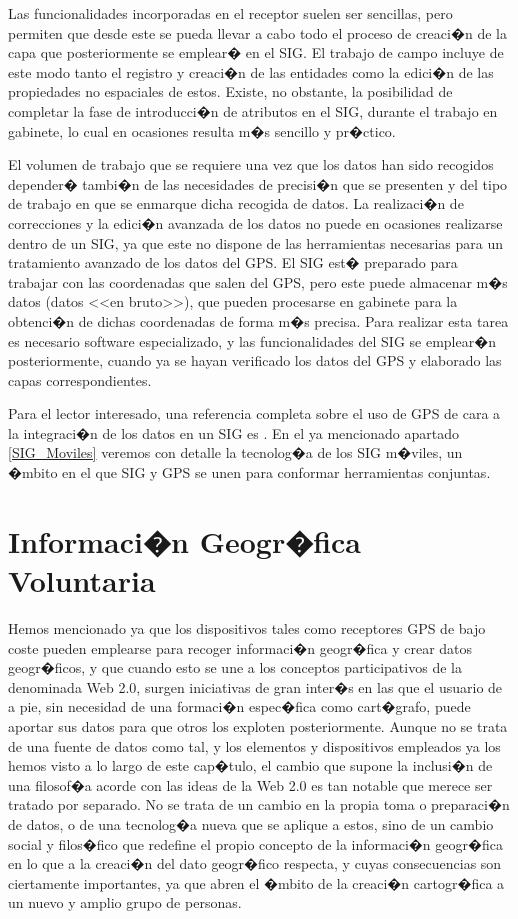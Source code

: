 Las funcionalidades incorporadas en el receptor suelen ser sencillas, pero permiten que desde este se pueda llevar a cabo todo el proceso de creaci�n de la capa que posteriormente se emplear� en el SIG. El trabajo de campo incluye de este modo tanto el registro y creaci�n de las entidades como la edici�n de las propiedades no espaciales de estos. Existe, no obstante, la posibilidad de completar la fase de introducci�n de atributos en el SIG, durante el trabajo en gabinete, lo cual en ocasiones resulta m�s sencillo y pr�ctico.

El volumen de trabajo que se requiere una vez que los datos han sido recogidos depender� tambi�n de las necesidades de precisi�n que se presenten y del tipo de trabajo en que se enmarque dicha recogida de datos. La realizaci�n de correcciones y la edici�n avanzada de los datos no puede en ocasiones realizarse dentro de un SIG, ya que este no dispone de las herramientas necesarias para un tratamiento avanzado de los datos del GPS. El SIG est� preparado para trabajar con las coordenadas que salen del GPS, pero este puede almacenar m�s datos (datos <<en bruto>>), que pueden procesarse en gabinete para la obtenci�n de dichas coordenadas de forma m�s precisa. Para realizar esta tarea  es necesario software especializado, y las funcionalidades del SIG se emplear�n posteriormente, cuando ya se hayan verificado los datos del GPS y elaborado las capas correspondientes.

Para el lector interesado, una referencia completa sobre el uso de GPS de cara a la integraci�n de los datos en un SIG es \cite{Steede2000ESRI}.  En el ya mencionado apartado \ref{SIG_Moviles} veremos con detalle la tecnolog�a de los SIG m�viles, un �mbito en el que SIG y GPS se unen para conformar herramientas conjuntas. 

\section{Informaci�n Geogr�fica Voluntaria}
\label{VGI}

Hemos mencionado ya que los dispositivos tales como receptores GPS de bajo coste pueden emplearse para recoger informaci�n geogr�fica y crear datos geogr�ficos, y que cuando esto se une a los conceptos participativos de la denominada Web 2.0, surgen iniciativas de gran inter�s en las que el usuario de a pie, sin necesidad de una formaci�n espec�fica como cart�grafo, puede aportar sus datos para que otros los exploten posteriormente. Aunque no se trata de una fuente de datos como tal, y los elementos y dispositivos empleados ya los hemos visto a lo largo de este cap�tulo, el cambio que supone la inclusi�n de una filosof�a acorde con las ideas de la Web 2.0 es tan notable que merece ser tratado por separado. No se trata de un cambio en la propia toma o preparaci�n de datos, o de una tecnolog�a nueva que se aplique a estos, sino de un cambio social y filos�fico que redefine el propio concepto de la informaci�n geogr�fica en lo que a la creaci�n del dato geogr�fico respecta, y cuyas consecuencias son ciertamente importantes, ya que abren el �mbito de la creaci�n cartogr�fica a un nuevo y amplio grupo de personas.

